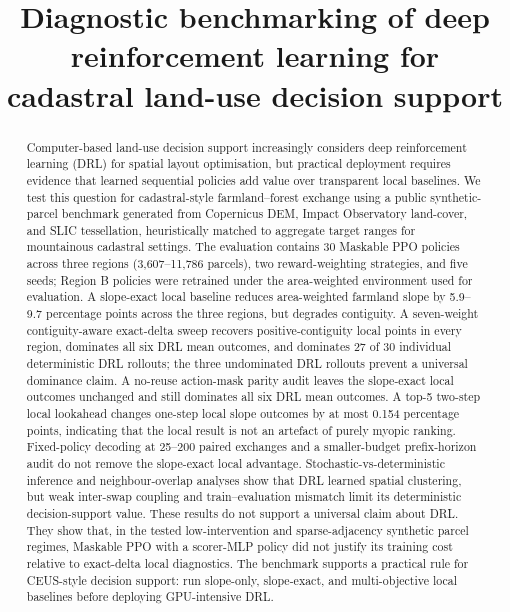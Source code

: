 \documentclass[]{interact}
\theoremstyle{plain}
\begin{document}

\title{Diagnostic benchmarking of deep reinforcement learning for cadastral land-use decision support}

\author{
}

\maketitle

\begin{abstract}
Computer-based land-use decision support increasingly considers deep reinforcement learning (DRL) for spatial layout optimisation, but practical deployment requires evidence that learned sequential policies add value over transparent local baselines. We test this question for cadastral-style farmland--forest exchange using a public synthetic-parcel benchmark generated from Copernicus DEM, Impact Observatory land-cover, and SLIC tessellation, heuristically matched to aggregate target ranges for mountainous cadastral settings. The evaluation contains 30 Maskable PPO policies across three regions (3{,}607--11{,}786 parcels), two reward-weighting strategies, and five seeds; Region B policies were retrained under the area-weighted environment used for evaluation. A slope-exact local baseline reduces area-weighted farmland slope by 5.9--9.7 percentage points across the three regions, but degrades contiguity. A seven-weight contiguity-aware exact-delta sweep recovers positive-contiguity local points in every region, dominates all six DRL mean outcomes, and dominates 27 of 30 individual deterministic DRL rollouts; the three undominated DRL rollouts prevent a universal dominance claim. A no-reuse action-mask parity audit leaves the slope-exact local outcomes unchanged and still dominates all six DRL mean outcomes. A top-5 two-step local lookahead changes one-step local slope outcomes by at most 0.154 percentage points, indicating that the local result is not an artefact of purely myopic ranking. Fixed-policy decoding at 25--200 paired exchanges and a smaller-budget prefix-horizon audit do not remove the slope-exact local advantage. Stochastic-vs-deterministic inference and neighbour-overlap analyses show that DRL learned spatial clustering, but weak inter-swap coupling and train--evaluation mismatch limit its deterministic decision-support value. These results do not support a universal claim about DRL. They show that, in the tested low-intervention and sparse-adjacency synthetic parcel regimes, Maskable PPO with a scorer-MLP policy did not justify its training cost relative to exact-delta local diagnostics. The benchmark supports a practical rule for CEUS-style decision support: run slope-only, slope-exact, and multi-objective local baselines before deploying GPU-intensive DRL.
\end{abstract}
\end{document}
